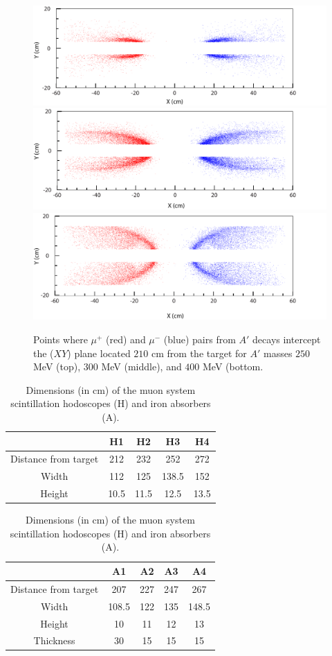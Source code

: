 \begin{figure}[!ht]
\includegraphics[scale=0.6]{muon/xy_m250.pdf}
\includegraphics[scale=0.6]{muon/xy_m300.pdf}
\includegraphics[scale=0.6]{muon/xy_m400.pdf}
\caption{\small{Points where $\mu^+$ (red) and $\mu^-$ (blue) pairs from $A'$ decays intercept the ($XY$) plane located $210$ cm from the 
target for $A'$ masses $250$ MeV (top), $300$ MeV (middle), and $400$ MeV (bottom.}}\label{fig:xymu}
\end{figure}

\begin{table}[htdp]
\caption{Dimensions (in cm) of the muon system scintillation hodoscopes (H) and iron absorbers (A). }
\begin{center}
\begin{tabular}{|c|c|c|c|c|}
\hline
&H1&H2&H3&H4\\
\hline
Distance from target& 212&232&252&272\\
Width&112&125&138.5&152\\
Height&10.5&11.5&12.5&13.5\\
\hline
\end{tabular}

\begin{tabular}{|c|c|c|c|c|}
\hline
&A1&A2&A3&A4\\
\hline
Distance from target& 207&227&247&267\\
Width&108.5&122&135&148.5\\
Height&10&11&12&13\\
Thickness & 30 & 15& 15 & 15\\
\hline
\end{tabular}
\end{center}
\label{tb:muon}
\end{table}%


